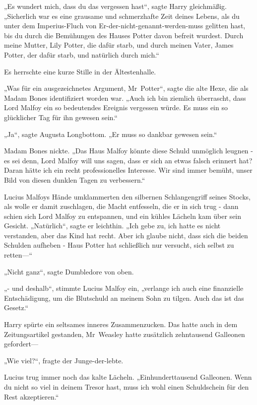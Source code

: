{„Es wundert mich, dass du das vergessen hast“, sagte Harry gleichmäßig. „Sicherlich war es eine grausame und schmerzhafte Zeit deines Lebens, als du unter dem Imperius-Fluch von Er-der-nicht-genannt-werden-muss gelitten hast, bis du durch die Bemühungen des Hauses Potter davon befreit wurdest. Durch meine Mutter, Lily Potter, die dafür starb, und durch meinen Vater, James Potter, der dafür starb, und natürlich durch mich.“

Es herrschte eine kurze Stille in der Ältestenhalle.

„Was für ein ausgezeichnetes Argument, Mr~Potter“, sagte die alte Hexe, die als Madam Bones identifiziert worden war. „Auch ich bin ziemlich überrascht, dass Lord Malfoy ein so bedeutendes Ereignis vergessen würde. Es muss ein so glücklicher Tag für ihn gewesen sein.“

„Ja“, sagte Augusta Longbottom. „Er muss so dankbar gewesen sein.“

Madam Bones nickte. „Das Haus Malfoy könnte diese Schuld unmöglich leugnen - es sei denn, Lord Malfoy will uns sagen, dass er sich an etwas falsch erinnert hat? Daran hätte ich ein recht professionelles Interesse. Wir sind immer bemüht, unser Bild von diesen dunklen Tagen zu verbessern.“

Lucius Malfoys Hände umklammerten den silbernen Schlangengriff seines Stocks, als wolle er damit zuschlagen, die Macht entfesseln, die er in sich trug - dann schien sich Lord Malfoy zu entspannen, und ein kühles Lächeln kam über sein Gesicht. „Natürlich“, sagte er leichthin. „Ich gebe zu, ich hatte es nicht verstanden, aber das Kind hat recht. Aber ich glaube nicht, dass sich die beiden Schulden aufheben - Haus Potter hat schließlich nur versucht, sich selbst zu retten—“

„Nicht ganz“, sagte Dumbledore von oben.

„- und deshalb“, stimmte Lucius Malfoy ein, „verlange ich auch eine finanzielle Entschädigung, um die Blutschuld an meinem Sohn zu tilgen. Auch das ist das Gesetz.“

Harry spürte ein seltsames inneres Zusammenzucken. Das hatte auch in dem Zeitungsartikel gestanden, Mr~Weasley hatte zusätzlich zehntausend Galleonen gefordert—

„Wie viel?“, fragte der Junge-der-lebte.

Lucius trug immer noch das kalte Lächeln. „Einhunderttausend Galleonen. Wenn du nicht so viel in deinem Tresor hast, muss ich wohl einen Schuldschein für den Rest akzeptieren.“

}
